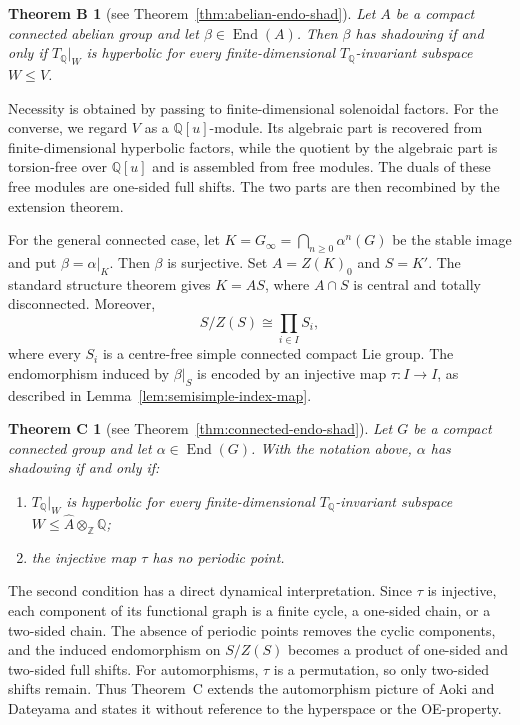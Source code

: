 \documentclass[12pt]{amsart}
\newtheorem*{theoremB}{Theorem B}
\newtheorem*{theoremC}{Theorem C}
\theoremstyle{definition}
\numberwithin{equation}{section}
\theoremstyle{remark}
\def\End{\operatorname{End}}
\begin{document}
\begin{theoremB}[see Theorem~\ref{thm:abelian-endo-shad}]
Let \(A\) be a compact connected abelian group and let
\(\beta\in\End(A)\). Then \(\beta\) has shadowing if and only if
\(T_{\mathbb Q}|_W\) is hyperbolic for every finite-dimensional
\(T_{\mathbb Q}\)-invariant subspace \(W\leq V\).
\end{theoremB}

Necessity is obtained by passing to finite-dimensional solenoidal factors. For
the converse, we regard \(V\) as a \(\mathbb Q[u]\)-module. Its algebraic
part is recovered from finite-dimensional hyperbolic factors, while the
quotient by the algebraic part is torsion-free over \(\mathbb Q[u]\) and is
assembled from free modules. The duals of these free modules are one-sided
full shifts. The two parts are then recombined by the extension theorem.

For the general connected case, let
\(K=G_\infty=\bigcap_{n\geq0}\alpha^n(G)\) be the stable image and put
\(\beta=\alpha|_K\). Then \(\beta\) is surjective. Set
\(A=Z(K)_0\) and \(S=K'\). The standard structure theorem gives
\(K=AS\), where \(A\cap S\) is central and totally disconnected. Moreover,
\[
S/Z(S)\cong\prod_{i\in I}S_i,
\]
where every \(S_i\) is a centre-free simple connected compact Lie group. The
endomorphism induced by \(\beta|_S\) is encoded by an injective map
\(\tau:I\to I\), as described in Lemma~\ref{lem:semisimple-index-map}.

\begin{theoremC}[see Theorem~\ref{thm:connected-endo-shad}]
Let \(G\) be a compact connected group and let \(\alpha\in\End(G)\).
With the notation above, \(\alpha\) has shadowing if and only if:
\begin{enumerate}
\item \(T_{\mathbb Q}|_W\) is hyperbolic for every finite-dimensional
\(T_{\mathbb Q}\)-invariant subspace
\(W\leq\widehat A\otimes_{\mathbb Z}\mathbb Q\);
\item the injective map \(\tau\) has no periodic point.
\end{enumerate}
\end{theoremC}

The second condition has a direct dynamical interpretation. Since \(\tau\) is
injective, each component of its functional graph is a finite cycle, a
one-sided chain, or a two-sided chain. The absence of periodic points removes
the cyclic components, and the induced endomorphism on \(S/Z(S)\) becomes a
product of one-sided and two-sided full shifts. For automorphisms, \(\tau\) is
a permutation, so only two-sided shifts remain. Thus Theorem~C extends the
automorphism picture of Aoki and Dateyama and states it without reference to
the hyperspace or the OE-property.
\end{document}
